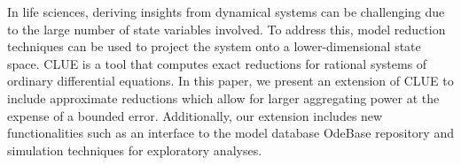 
In life sciences, deriving insights from dynamical systems can be challenging due to the large number of state variables involved. 
To address this, model reduction techniques can be used to project the system onto a lower-dimensional state space.
CLUE is a tool that computes exact reductions for rational systems of ordinary differential equations.
In this paper, we present an extension of CLUE to include approximate reductions which allow for larger aggregating power at the expense of a bounded error.
Additionally, our extension includes new functionalities such as an interface to the model database OdeBase repository and simulation techniques for exploratory analyses.

